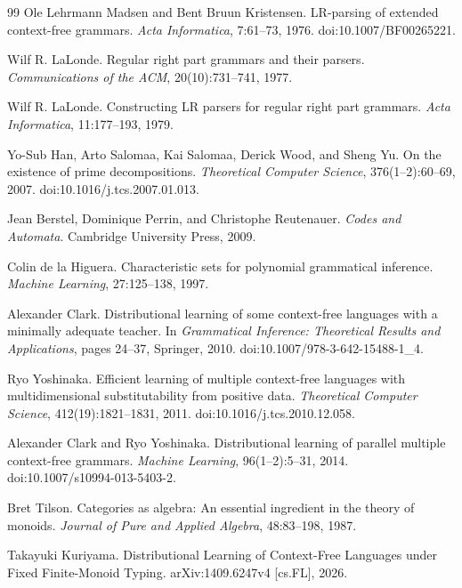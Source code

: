 \documentclass[11pt,a4paper]{article}
\begin{document}
\begin{thebibliography}{99}
Ole Lehrmann Madsen and Bent Bruun Kristensen.
\newblock LR-parsing of extended context-free grammars.
\newblock \emph{Acta Informatica}, 7:61--73, 1976.
\newblock doi:10.1007/BF00265221.

Wilf R. LaLonde.
\newblock Regular right part grammars and their parsers.
\newblock \emph{Communications of the ACM}, 20(10):731--741, 1977.

Wilf R. LaLonde.
\newblock Constructing LR parsers for regular right part grammars.
\newblock \emph{Acta Informatica}, 11:177--193, 1979.

Yo-Sub Han, Arto Salomaa, Kai Salomaa, Derick Wood, and Sheng Yu.
\newblock On the existence of prime decompositions.
\newblock \emph{Theoretical Computer Science}, 376(1--2):60--69, 2007.
\newblock doi:10.1016/j.tcs.2007.01.013.

Jean Berstel, Dominique Perrin, and Christophe Reutenauer.
\newblock \emph{Codes and Automata}.
\newblock Cambridge University Press, 2009.

Colin de la Higuera.
\newblock Characteristic sets for polynomial grammatical inference.
\newblock \emph{Machine Learning}, 27:125--138, 1997.

Alexander Clark.
\newblock Distributional learning of some context-free languages with a minimally adequate teacher.
\newblock In \emph{Grammatical Inference: Theoretical Results and Applications}, pages 24--37, Springer, 2010.
\newblock doi:10.1007/978-3-642-15488-1\_4.

Ryo Yoshinaka.
\newblock Efficient learning of multiple context-free languages with multidimensional substitutability from positive data.
\newblock \emph{Theoretical Computer Science}, 412(19):1821--1831, 2011.
\newblock doi:10.1016/j.tcs.2010.12.058.

Alexander Clark and Ryo Yoshinaka.
\newblock Distributional learning of parallel multiple context-free grammars.
\newblock \emph{Machine Learning}, 96(1--2):5--31, 2014.
\newblock doi:10.1007/s10994-013-5403-2.

Bret Tilson.
\newblock Categories as algebra: An essential ingredient in the theory of monoids.
\newblock \emph{Journal of Pure and Applied Algebra}, 48:83--198, 1987.

Takayuki Kuriyama.
\newblock Distributional Learning of Context-Free Languages under Fixed Finite-Monoid Typing.
\newblock arXiv:1409.6247v4 [cs.FL], 2026.

\end{thebibliography}
\end{document}
